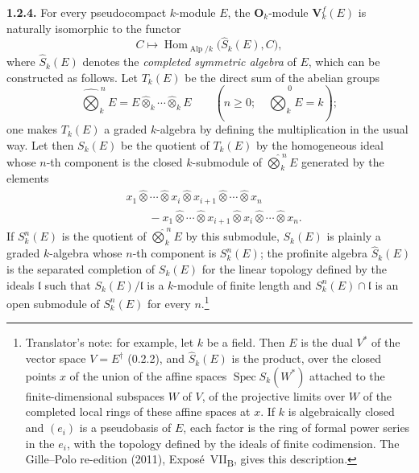 
\medskip
\noindent{}\textbf{1.2.4.}
\label{sga3:VIIB:1.2.4}
For every pseudocompact \(k\)-module \(E\), the \(\mathbf O_k\)-module
\(\mathbf V^f_k(E)\) is naturally isomorphic to the functor
\[
  C\longmapsto\operatorname{Hom}_{\operatorname{Alp}/k}\bigl(\widehat S_k(E),C\bigr),
\]
where \(\widehat S_k(E)\) denotes the \emph{completed symmetric algebra} of
\(E\), which can be constructed as follows. Let \(T_k(E)\) be the direct
sum of the abelian groups
\[
  \widehat{\bigotimes}_{k}^{\,n}E
  =
  E\widehat{\otimes}_{k}\cdots\widehat{\otimes}_{k}E
  \qquad
  \left(
    n\geq0;\quad
    \widehat{\bigotimes}_{k}^{\,0}E=k
  \right);
\]
one makes \(T_k(E)\) a graded \(k\)-algebra by defining the
multiplication in the usual way. Let then \(S_k(E)\) be the quotient of
\(T_k(E)\) by the homogeneous ideal whose \(n\)-th component is the
closed \(k\)-submodule of \(\widehat{\bigotimes}_{k}^{\,n}E\) generated by
the elements
\[
\begin{aligned}
&x_1\widehat{\otimes}\cdots\widehat{\otimes}x_i
 \widehat{\otimes}x_{i+1}\widehat{\otimes}\cdots
 \widehat{\otimes}x_n
\\[-0.1em]
&\qquad{}-
x_1\widehat{\otimes}\cdots\widehat{\otimes}x_{i+1}
 \widehat{\otimes}x_i\widehat{\otimes}\cdots
 \widehat{\otimes}x_n.
\end{aligned}
\]
If \(S_k^n(E)\) is the quotient of \(\widehat{\bigotimes}_{k}^{\,n}E\) by
this submodule, \(S_k(E)\) is plainly a graded \(k\)-algebra whose
\(n\)-th component is \(S_k^n(E)\); the profinite algebra
\(\widehat S_k(E)\) is the separated completion of \(S_k(E)\) for the
linear topology defined by the ideals \(\mathfrak l\) such that
\(S_k(E)/\mathfrak l\) is a \(k\)-module of finite length and
\(S_k^n(E)\cap\mathfrak l\) is an open submodule of \(S_k^n(E)\) for
every \(n\).\footnote{Translator's note: for example, let \(k\) be a field. Then \(E\) is the dual
\(V^*\) of the vector space \(V=E^\dagger\) (0.2.2), and \(\widehat S_k(E)\) is the product, over the
closed points \(x\) of the union of the affine spaces \(\operatorname{Spec}S_k(W^*)\) attached to the
finite-dimensional subspaces \(W\) of \(V\), of the projective limits over \(W\) of the completed local
rings of these affine spaces at \(x\). If \(k\) is algebraically closed and \((e_i)\) is a pseudobasis of
\(E\), each factor is the ring of formal power series in the \(e_i\), with the topology defined by the
ideals of finite codimension. The Gille--Polo re-edition (2011), Expos\'e~VII\textsubscript{B}, gives this
description.}

